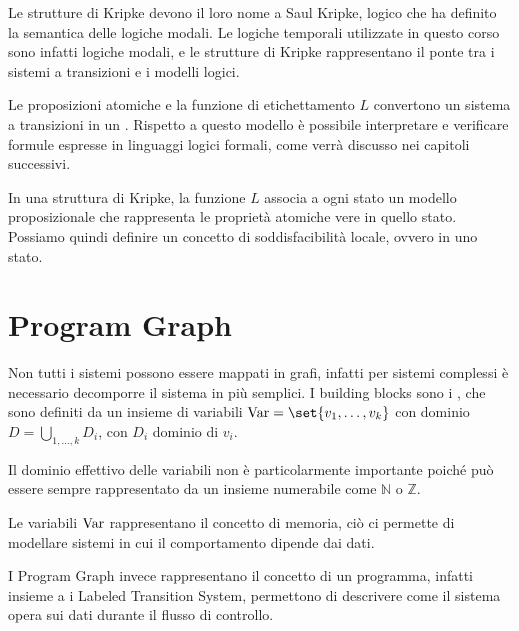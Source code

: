 Le strutture di Kripke devono il loro nome a Saul Kripke, logico che ha definito la semantica delle logiche modali. Le logiche temporali utilizzate in questo corso sono infatti logiche modali, e le strutture di Kripke rappresentano il ponte tra i sistemi a transizioni e i modelli logici.

Le proposizioni atomiche e la funzione di etichettamento \(L\) convertono un sistema a transizioni in un . Rispetto a questo modello è possibile interpretare e verificare formule espresse in linguaggi logici formali, come verrà discusso nei capitoli successivi.

In una struttura di Kripke, la funzione \(L\) associa a ogni stato un modello proposizionale che rappresenta le proprietà atomiche vere in quello stato.
Possiamo quindi definire un concetto di soddisfacibilità locale, ovvero in uno stato.


\section{Program Graph}
Non tutti i sistemi possono essere mappati in grafi, infatti per sistemi complessi è necessario decomporre il sistema in  più semplici.
I building blocks  sono i , che sono definiti da un insieme di variabili \(\Var = \set{v_1,\ldots,v_k}\) con dominio \(D = \bigcup_{1,\ldots,k} D_i\), con \(D_i\) dominio di \(v_i\).

\begin{note}{}
  Il dominio effettivo delle variabili non è particolarmente importante poiché può essere sempre rappresentato da un insieme numerabile come \(\mathbb{N}\) o \(\mathbb{Z}\).
\end{note}

Le variabili \(\operatorname{Var}\) rappresentano il concetto di memoria, ciò ci permette di modellare sistemi in cui il comportamento dipende dai dati.

I Program Graph invece rappresentano il concetto di un programma, infatti insieme a
i Labeled Transition System, permettono di descrivere come il sistema opera sui dati
durante il flusso di controllo.

